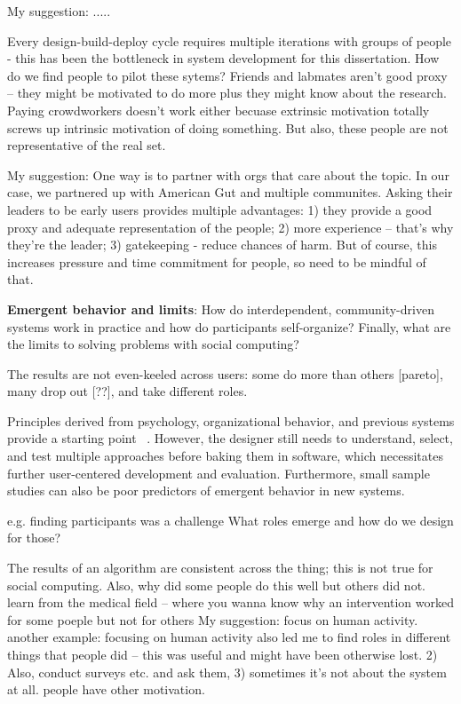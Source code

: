 My suggestion: ..... 

Every design-build-deploy cycle requires multiple iterations with groups of people - this has been the bottleneck in system development for this dissertation. How do we find people to pilot these sytems? Friends and labmates aren't good proxy -- they might be motivated to do more plus they might know about the research. Paying crowdworkers doesn't work either becuase extrinsic motivation totally screws up intrinsic motivation of doing something. But also, these people are not representative of the real set.

My suggestion: One way is to partner with orgs that care about the topic. In our case, we partnered up with American Gut and multiple communites. Asking their leaders to be early users provides multiple advantages: 1) they provide a good proxy and adequate representation of the people; 2) more experience -- that's why they're the leader; 3) gatekeeping - reduce chances of harm. But of course, this increases pressure and time commitment for people, so need to be mindful of that. 


\textbf{Emergent behavior and limits}: How do interdependent, community-driven systems work in practice and how do participants self-organize? Finally, what are the limits to solving problems with social computing? 

The results are not even-keeled across users: some do more than others [pareto], many drop out [??], and take different roles.

Principles derived from psychology, organizational behavior, and previous systems provide a starting point ~\cite{fromstatement}. However, the designer still needs to understand, select, and test multiple approaches before baking them in software, which necessitates further user-centered development and evaluation. Furthermore, small sample studies can also be poor predictors of emergent behavior in new systems. 

e.g. finding participants was a challenge 
What roles emerge and how do we design for those?

The results of an algorithm are consistent across the thing; this is not true for social computing. 
Also, why did some people do this well but others did not. learn from the medical field -- where you wanna know why an intervention worked for some poeple but not for others
My suggestion: focus on human activity. another example: focusing on human activity also led me to find roles in different things that people did -- this was useful and might have been otherwise lost. 2) Also, conduct surveys etc. and ask them, 3) sometimes it's not about the system at all. people have other motivation.

